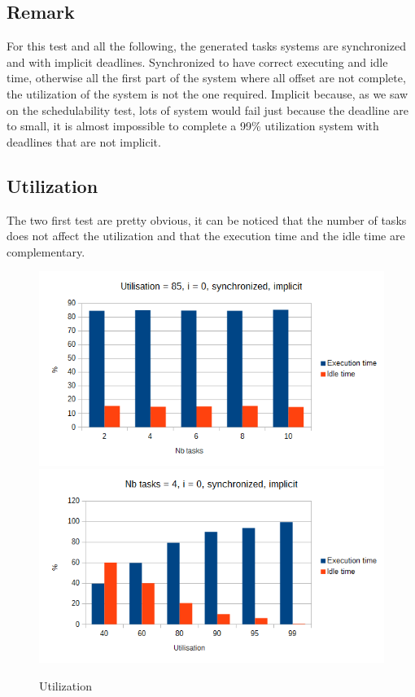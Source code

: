 \documentclass[a4paper,12pt]{article}
\begin{document}
\subsection{Remark}
For this test and all the following, the generated tasks systems are synchronized and with implicit deadlines. Synchronized to have correct executing and idle time, otherwise all the first part of the system where all offset are not complete, the utilization of the system is not the one required. Implicit because, as we saw on the schedulability test, lots of system would fail just because the deadline are to small, it is almost impossible to complete a 99\% utilization system with deadlines that are not implicit.

\subsection{Utilization}
The two first test  are pretty obvious, it can be noticed that the number of tasks does not affect the utilization and that the execution time and the idle time are complementary.
\begin{figure}[H]
	\begin{center}
		\includegraphics[scale=0.49]{nbtaskstime.png}
		\includegraphics[scale=0.49]{utilisationtime.png}
	\end{center}
	\label{u}
	\caption{Utilization}
\end{figure}
\end{document}

